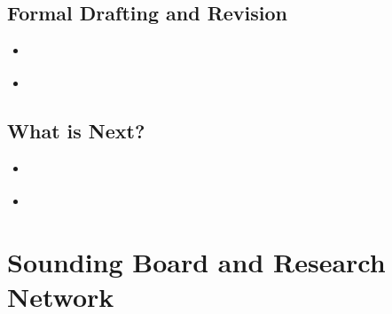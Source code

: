 \documentclass[11pt]{article}
\begin{document}
\subsection{Formal Drafting and Revision}
\begin{itemize}
\item \begin{exercise}
\end{exercise}

\vspace{20pt}
\item \begin{exercise}
\end{exercise}
\end{itemize}
\subsection{What is Next?}
\begin{itemize}
\item \begin{exercise}
\end{exercise}

\vspace{20pt}
\item \begin{exercise}
\end{exercise}
\end{itemize}
\section{Sounding Board and Research Network}
\end{document}

